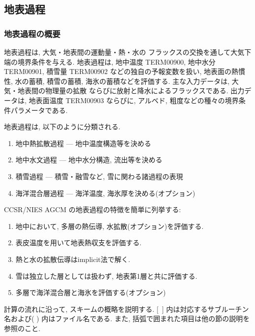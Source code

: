 ﻿
\subsection{地表過程}

\subsubsection{地表過程の概要}

地表過程は, 大気・地表間の運動量・熱・水の
フラックスの交換を通して大気下端の境界条件を与える.
地表過程は, 地中温度 TERM00900, 地中水分 TERM00901,
積雪量 TERM00902 などの独自の予報変数を扱い,
地表面の熱慣性, 水の蓄積, 積雪の蓄積, 
海氷の蓄積などを評価する.
主な入力データは, 大気・地表間の物理量の拡散
ならびに放射と降水によるフラックスである.
出力データは, 地表面温度 TERM00903 ならびに,
アルベド, 粗度などの種々の境界条件パラメータである.

地表過程は, 以下のように分類される.
\begin{enumerate}
  \item 地中熱拡散過程 --- 地中温度構造等を決める
  \item 地中水文過程   ---  地中水分構造, 流出等を決める
  \item 積雪過程        ---  積雪・融雪など, 雪に関わる諸過程の表現
  \item 海洋混合層過程 --- 海洋温度, 海氷厚を決める(オプション)
\end{enumerate}
      
CCSR/NIES AGCM の地表過程の特徴を簡単に列挙する:
\begin{enumerate}
\item 地中において, 多層の熱伝導, 水拡散(オプション)を評価する.
\item 表皮温度を用いて地表熱収支を評価する.
\item 熱と水の拡散伝導はimplicit法で解く.
\item 雪は独立した層としては扱わず, 地表第1層と共に評価する.
\item 多層で海洋混合層と海氷を評価する(オプション)
\end{enumerate}

計算の流れに沿って, スキームの概略を説明する.
[\ ] 内は対応するサブルーチン名および( ) 内はファイル名である.
また, 括弧で囲まれた項目は他の節の説明を参照のこと.


